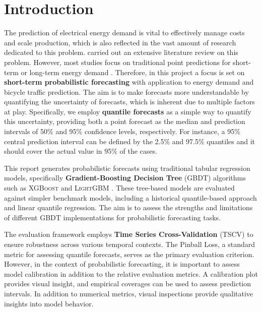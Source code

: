 \section{Introduction}
\label{ch:Introduction}

The prediction of electrical energy demand is vital to effectively manage costs and scale production, which is also reflected in the vast amount of research dedicated to this problem. \Cite{nti_electricity_2020} carried out an extensive literature review on this problem. However, most studies focus on traditional point predictions for short-term or long-term energy demand \parencite[915]{hong_probabilistic_2016}. Therefore, in this project a focus is set on \textbf{short-term probabilistic forecasting} with application to energy demand and bicycle traffic prediction. The aim is to make forecasts more understandable by quantifying the uncertainty of forecasts, which is inherent due to multiple factors at play. Specifically, we employ \textbf{quantile forecasts} as a simple way to quantify this uncertainty, providing both a point forecast as the median and prediction intervals of 50\% and 95\% confidence levels, respectively. For instance, a 95\% central prediction interval can be defined by the 2.5\% and 97.5\% quantiles and it should cover the actual value in 95\% of the cases.

This report generates probabilistic forecasts using traditional tabular regression models, specifically \textbf{Gradient-Boosting Decision Tree} (GBDT) algorithms such as \textsc{XGBoost} \parencite{chen_xgboost_2016} and \textsc{LightGBM} \parencite{ke_lightgbm_2017}. These tree-based models are evaluated against simpler benchmark models, including a historical quantile-based approach and linear quantile regression. The aim is to assess the strengths and limitations of different GBDT implementations for probabilistic forecasting tasks.

The evaluation framework employs \textbf{Time Series Cross-Validation} (TSCV) to ensure robustness across various temporal contexts. The Pinball Loss, a standard metric for assessing quantile forecasts, serves as the primary evaluation criterion. However, in the context of probabilistic forecasting, it is important to assess model calibration in addition to the relative evaluation metrics. A calibration plot provides visual insight, and empirical coverages can be used to assess prediction intervals.
In addition to numerical metrics, visual inspections provide qualitative insights into model behavior.

